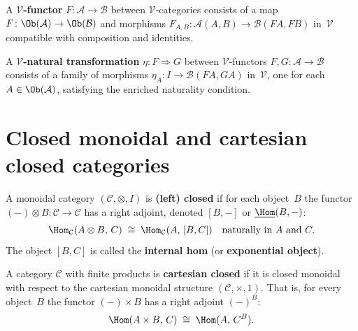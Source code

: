 \begin{definition}\label{def:enriched-functor}
A \textbf{$\mathcal{V}$-functor} $F\colon\mathcal{A}\to\mathcal{B}$
between $\mathcal{V}$-categories consists of a map
$F\colon\Ob(\mathcal{A})\to\Ob(\mathcal{B})$ and morphisms
$F_{A,B}\colon\mathcal{A}(A,B)\to\mathcal{B}(FA,FB)$ in~$\mathcal{V}$
compatible with composition and identities.
\end{definition}

\begin{definition}\label{def:enriched-nat}
A \textbf{$\mathcal{V}$-natural transformation}
$\eta\colon F\Rightarrow G$ between $\mathcal{V}$-functors
$F,G\colon\mathcal{A}\to\mathcal{B}$ consists of a family of morphisms
$\eta_A\colon I\to\mathcal{B}(FA,GA)$ in~$\mathcal{V}$, one for each
$A\in\Ob(\mathcal{A})$, satisfying the enriched naturality condition.
\end{definition}



\section{Closed monoidal and cartesian closed categories}%
\label{sec:closed-monoidal}


\begin{definition}\label{def:closed-monoidal}
A monoidal category $(\mathcal{C}, \otimes, I)$ is
\textbf{(left) closed} if for each object~$B$ the functor
$(-)\otimes B\colon\mathcal{C}\to\mathcal{C}$ has a right adjoint,
denoted $[B, -]$ or $\underline{\Hom}(B,-)$:
\[
    \Hom_\mathcal{C}(A\otimes B,\, C)
    \;\cong\;
    \Hom_\mathcal{C}(A,\, [B,C])
    \quad\text{naturally in } A \text{ and } C.
\]
The object $[B,C]$ is called the \textbf{internal hom}
(or \textbf{exponential object}).
\end{definition}

\begin{definition}\label{def:cartesian-closed}
A category $\mathcal{C}$ with finite products is \textbf{cartesian closed}
if it is closed monoidal with respect to the cartesian monoidal structure
$(\mathcal{C}, \times, 1)$.  That is, for every object~$B$ the functor
$(-)\times B$ has a right adjoint $(-)^B$:
\[
    \Hom(A\times B,\, C) \;\cong\; \Hom(A,\, C^B).
\]
\end{definition}

